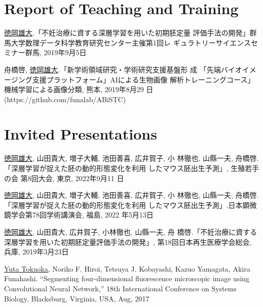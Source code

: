 \documentclass[letterpaper]{article}
\renewenvironment{itemize}{
  \begin{list}{}{
    \setlength{\leftmargin}{1.5em}
  }
}{
  \end{list}
}
\begin{document}




\section*{\bf Report of Teaching and Training}
\vspace{-0.6cm}
\hrulefill

\begin{itemize}
 \item \underline{徳岡雄大}.「不妊治療に資する深層学習を用いた初期胚定量
       評価手法の開発」群馬大学数理データ科学教育研究センター主催第1回レ
       ギュラトリーサイエンスセミナー群馬, 2019年9月5日
 \item 舟橋啓, \underline{徳岡雄大}.「新学術領域研究・学術研究支援基盤形
       成 「先端バイオイメージング支援プラットフォーム」AIによる生物画像
       解析トレーニングコース」機械学習による画像分類, 熊本, 2019年8月29
       日 \\ (https://github.com/funalab/ABiSTC) \\
\end{itemize}


\section*{\bf Invited Presentations}
\vspace{-0.6cm}
\hrulefill

\begin{itemize}
 \item \underline{徳岡雄大}, 山田貴大, 増子大輔, 池田善喜, 広井賀子, 小
       林徹也, 山縣一夫, 舟橋啓.「深層学習が捉えた胚の動的形態変化を利用
       したマウス胚出生予測」, 生殖若手の会 第8回大会, 東京, 2022年9月11
       日
 \item \underline{徳岡雄大}, 山田貴大, 増子大輔, 池田善喜, 広井賀子, 小
       林徹也, 山縣一夫, 舟橋啓.「深層学習が捉えた胚の動的形態変化を利用
       したマウス胚出生予測」,日本顕微鏡学会第78回学術講演会, 福島, 2022
       年5月13日
 \item \underline{徳岡雄大}, 山田貴大, 広井賀子, 小林徹也, 山縣一夫, 舟
       橋啓.「不妊治療に資する深層学習を用いた初期胚定量評価手法の開発」,
       第18回日本再生医療学会総会, 兵庫, 2019年3月23日
 \item \underline{Yuta Tokuoka}, Noriko F. Hiroi, Tetsuya J. Kobayashi,
       Kazuo Yamagata, Akira Funahashi. ``Segmenting four-dimensional
       fluorescence microscopic image using Convolutional Neural
       Network,'' 18th International Conference on Systems Biology,
       Blacksburg, Virginia, USA, Aug, 2017 \\
\end{itemize}
\end{document}
